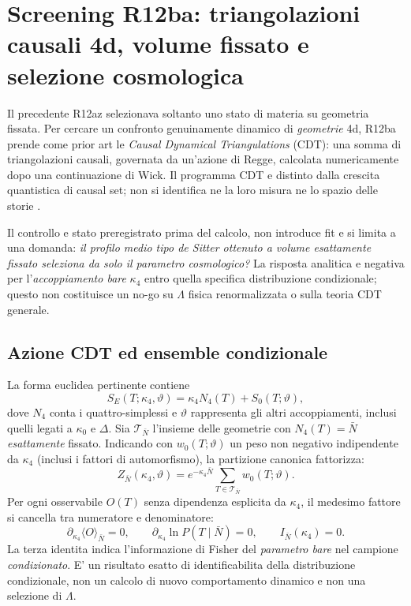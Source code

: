 \documentclass[11pt,a4paper]{article}
\begin{document}
\section{Screening R12ba: triangolazioni causali 4d, volume fissato e selezione cosmologica}
\label{sec:r12ba-screen}

Il precedente R12az selezionava soltanto uno stato di materia su geometria fissata. Per cercare un confronto genuinamente dinamico di \emph{geometrie} 4d, R12ba prende come prior art le \emph{Causal Dynamical Triangulations} (CDT): una somma di triangolazioni causali, governata da un'azione di Regge, calcolata numericamente dopo una continuazione di Wick. Il programma CDT e distinto dalla crescita quantistica di causal set; non si identifica ne la loro misura ne lo spazio delle storie \cite{AmbjornLoll2026CDT,GlaserLoll2017CDT,GizbertStudnicki2024}.

Il controllo e stato preregistrato prima del calcolo, non introduce fit e si limita a una domanda: \emph{il profilo medio tipo de Sitter ottenuto a volume esattamente fissato seleziona da solo il parametro cosmologico?} La risposta analitica e negativa per l'\emph{accoppiamento bare} $\kappa_4$ entro quella specifica distribuzione condizionale; questo non costituisce un no-go su $\Lambda$ fisica renormalizzata o sulla teoria CDT generale.

\subsection{Azione CDT ed ensemble condizionale}

La forma euclidea pertinente contiene \cite{AmbjornLoll2026CDT,GlaserLoll2017CDT}
\begin{equation}\label{eq:r12ba-action}
 S_E(T;\kappa_4,\vartheta)=\kappa_4 N_4(T)+S_0(T;\vartheta),
\end{equation}
dove $N_4$ conta i quattro-simplessi e $\vartheta$ rappresenta gli altri accoppiamenti, inclusi quelli legati a $\kappa_0$ e $\Delta$. Sia $\mathcal T_{\bar N}$ l'insieme delle geometrie con $N_4(T)=\bar N$ \emph{esattamente} fissato. Indicando con $w_0(T;\vartheta)$ un peso non negativo indipendente da $\kappa_4$ (inclusi i fattori di automorfismo), la partizione canonica fattorizza:
\begin{equation}\label{eq:r12ba-Z}
 Z_{\bar N}(\kappa_4,\vartheta)
 =e^{-\kappa_4\bar N}
 \sum_{T\in\mathcal T_{\bar N}}w_0(T;\vartheta).
\end{equation}
Per ogni osservabile $O(T)$ senza dipendenza esplicita da $\kappa_4$, il medesimo fattore si cancella tra numeratore e denominatore:
\begin{equation}\label{eq:r12ba-cancel}
 \boxed{\quad\partial_{\kappa_4}\langle O\rangle_{\bar N}=0,\qquad
 \partial_{\kappa_4}\ln P(T\mid\bar N)=0,\qquad
 I_{\bar N}(\kappa_4)=0.\quad}
\end{equation}
La terza identita indica l'informazione di Fisher del \emph{parametro bare} nel campione \emph{condizionato}. E' un risultato esatto di identificabilita della distribuzione condizionale, non un calcolo di nuovo comportamento dinamico e non una selezione di $\Lambda$.
\end{document}
